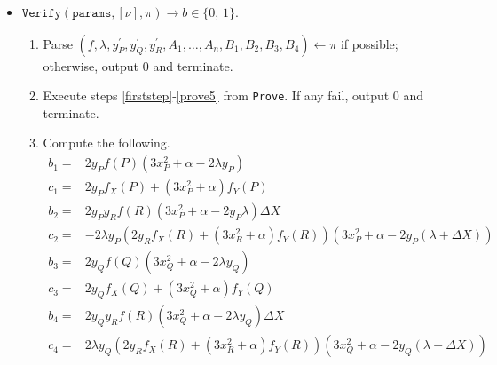 \documentclass[11pt,letterpaper]{article}
\theoremstyle{definition}
\newcommand{\6}{\mathbf}
\newcommand{\7}{\mathcal}
\newcommand{\zo}{\{0, \, 1\}}
\begin{document}
\begin{itemize}
\item $\texttt{Verify}(\texttt{params}, [\nu], \pi) \to b \in \zo$.
\begin{enumerate}
\item \label{verify1} Parse $(f, \lambda, y_P^\prime, y_Q^\prime, y_R^\prime, A_1, \ldots, A_n, B_1, B_2, B_3, B_4) \leftarrow \pi$ if possible; otherwise, output $0$ and terminate.
\item \label{verify2}  Execute steps \ref{firststep}-\ref{prove5} from \texttt{Prove}. If any fail, output $0$ and terminate.
\item  \label{verify3} Compute the following.
\begin{align}
b_1 =& 2y_Pf(P)(3x_P^2+\alpha-2\lambda y_P) \\
c_1 =& 2y_Pf_X(P) + (3x_P^2+\alpha) f_Y(P)\\
b_2 =& 2y_Py_Rf(R)(3x_P^2+\alpha-2y_P \lambda ) \Delta X\\
c_2 =& - 2\lambda y_P(2y_Rf_X(R) + (3x_R^2+\alpha) f_Y(R))(3x_P^2+\alpha - 2y_P(\lambda + \Delta X))\\
b_3 =& 2y_Qf(Q)(3x_Q^2+\alpha - 2\lambda y_Q)\\
c_3 =& 2y_Qf_X(Q) + (3x_Q^2+\alpha) f_Y(Q) \\
b_4 =& 2y_Qy_Rf(R)(3x_Q^2+\alpha  - 2\lambda y_Q) \Delta X\\
c_4 =& 2\lambda y_Q(2y_Rf_X(R) + (3x_R^2+\alpha)f_Y(R))(3x_Q^2+\alpha - 2y_Q(\lambda + \Delta X))
\end{align}


\end{enumerate}
\end{itemize}
\end{document}
